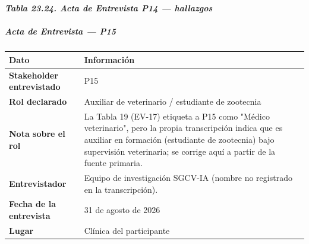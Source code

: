 \documentclass[
]{article}
\newcounter{none} %
\begin{document}
\protect{}\label{_bookmark_P14_hallazgos}{}\emph{\textbf{Tabla 23.24. Acta de Entrevista P14 --- hallazgos}}

\subparagraph{Acta de Entrevista --- P15}\label{acta-entrevista-p15}

{\def\LTcaptype{none} %
\begin{longtable}[]{|
  >{\raggedright\arraybackslash}p{}|
  >{\raggedright\arraybackslash}p{}|}
\hline
\begin{minipage}[b]{\linewidth}\centering
\textbf{Dato}
\end{minipage} & \begin{minipage}[b]{\linewidth}\centering
\textbf{Información}
\end{minipage} \\
\hline
\endhead
\hline
\endlastfoot
\textbf{Stakeholder entrevistado} & \begin{minipage}[t]{\linewidth}\raggedright
P15
\end{minipage} \\
\hline
\textbf{Rol declarado} & \begin{minipage}[t]{\linewidth}\raggedright
Auxiliar de veterinario / estudiante de zootecnia
\end{minipage} \\
\hline
\textbf{Nota sobre el rol} & \begin{minipage}[t]{\linewidth}\raggedright
La Tabla 19 (EV-17) etiqueta a P15 como "Médico veterinario", pero la propia transcripción indica que es auxiliar en formación (estudiante de zootecnia) bajo supervisión veterinaria; se corrige aquí a partir de la fuente primaria.
\end{minipage} \\
\hline
\textbf{Entrevistador} & \begin{minipage}[t]{\linewidth}\raggedright
Equipo de investigación SGCV-IA (nombre no registrado en la transcripción).
\end{minipage} \\
\hline
\textbf{Fecha de la entrevista} & \begin{minipage}[t]{\linewidth}\raggedright
31 de agosto de 2026
\end{minipage} \\
\hline
\textbf{Lugar} & \begin{minipage}[t]{\linewidth}\raggedright
Clínica del participante
\end{minipage} \\

\end{longtable}}
\end{document}
